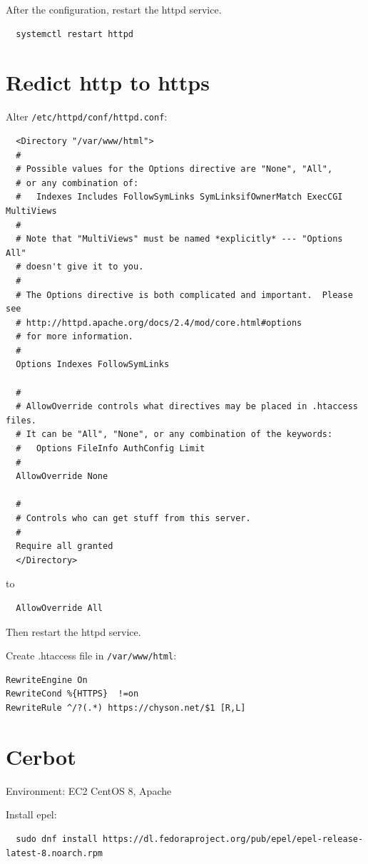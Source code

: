 After the configuration, restart the httpd service.
\begin{lstlisting}
  systemctl restart httpd
\end{lstlisting}


\section{Redict http to https}

Alter \verb|/etc/httpd/conf/httpd.conf|:
\begin{lstlisting}
  <Directory "/var/www/html">
  #
  # Possible values for the Options directive are "None", "All",
  # or any combination of:
  #   Indexes Includes FollowSymLinks SymLinksifOwnerMatch ExecCGI MultiViews
  #
  # Note that "MultiViews" must be named *explicitly* --- "Options All"
  # doesn't give it to you.
  #
  # The Options directive is both complicated and important.  Please see
  # http://httpd.apache.org/docs/2.4/mod/core.html#options 
  # for more information.
  #
  Options Indexes FollowSymLinks

  #
  # AllowOverride controls what directives may be placed in .htaccess files.
  # It can be "All", "None", or any combination of the keywords:
  #   Options FileInfo AuthConfig Limit
  #
  AllowOverride None

  #
  # Controls who can get stuff from this server.
  #
  Require all granted
  </Directory>
\end{lstlisting}
to
\begin{lstlisting}
  AllowOverride All  
\end{lstlisting}

Then restart the httpd service.


Create .htaccess file in \verb|/var/www/html|:
\begin{tcolorbox}
\begin{verbatim}
RewriteEngine On 
RewriteCond %{HTTPS}  !=on 
RewriteRule ^/?(.*) https://chyson.net/$1 [R,L]
\end{verbatim}
\end{tcolorbox}




\section{Cerbot}

Environment: EC2 CentOS 8, Apache

Install epel:
\begin{lstlisting}
  sudo dnf install https://dl.fedoraproject.org/pub/epel/epel-release-latest-8.noarch.rpm
\end{lstlisting}


